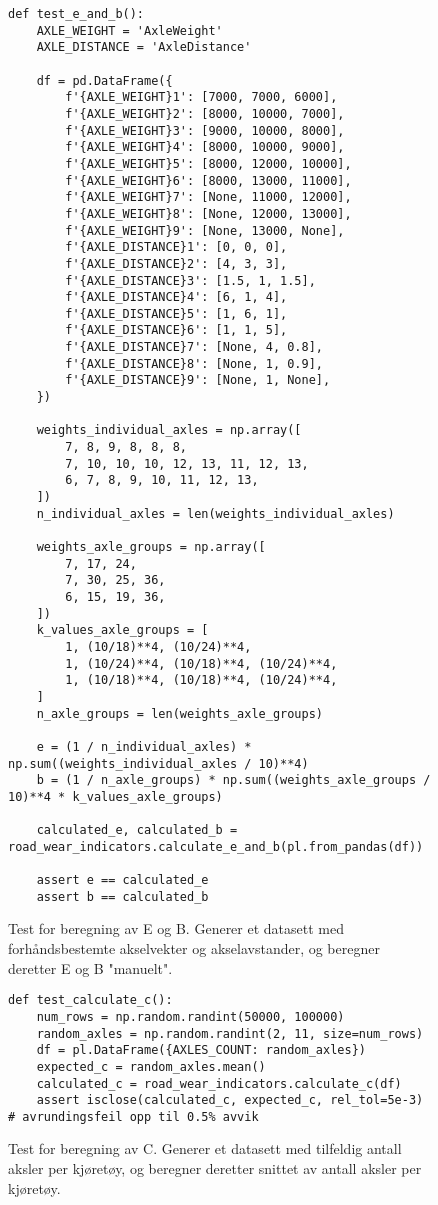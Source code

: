 \begin{figure}[ht]
\centering
\scriptsize
\begin{lstlisting}
def test_e_and_b():
    AXLE_WEIGHT = 'AxleWeight'
    AXLE_DISTANCE = 'AxleDistance'

    df = pd.DataFrame({
        f'{AXLE_WEIGHT}1': [7000, 7000, 6000],
        f'{AXLE_WEIGHT}2': [8000, 10000, 7000],
        f'{AXLE_WEIGHT}3': [9000, 10000, 8000],
        f'{AXLE_WEIGHT}4': [8000, 10000, 9000],
        f'{AXLE_WEIGHT}5': [8000, 12000, 10000],
        f'{AXLE_WEIGHT}6': [8000, 13000, 11000],
        f'{AXLE_WEIGHT}7': [None, 11000, 12000],
        f'{AXLE_WEIGHT}8': [None, 12000, 13000],
        f'{AXLE_WEIGHT}9': [None, 13000, None],
        f'{AXLE_DISTANCE}1': [0, 0, 0],
        f'{AXLE_DISTANCE}2': [4, 3, 3],
        f'{AXLE_DISTANCE}3': [1.5, 1, 1.5],
        f'{AXLE_DISTANCE}4': [6, 1, 4],
        f'{AXLE_DISTANCE}5': [1, 6, 1],
        f'{AXLE_DISTANCE}6': [1, 1, 5],
        f'{AXLE_DISTANCE}7': [None, 4, 0.8],
        f'{AXLE_DISTANCE}8': [None, 1, 0.9],
        f'{AXLE_DISTANCE}9': [None, 1, None],
    })

    weights_individual_axles = np.array([
        7, 8, 9, 8, 8, 8,
        7, 10, 10, 10, 12, 13, 11, 12, 13, 
        6, 7, 8, 9, 10, 11, 12, 13,
    ])
    n_individual_axles = len(weights_individual_axles)

    weights_axle_groups = np.array([
        7, 17, 24,
        7, 30, 25, 36, 
        6, 15, 19, 36,
    ])
    k_values_axle_groups = [
        1, (10/18)**4, (10/24)**4, 
        1, (10/24)**4, (10/18)**4, (10/24)**4,
        1, (10/18)**4, (10/18)**4, (10/24)**4,
    ]
    n_axle_groups = len(weights_axle_groups)

    e = (1 / n_individual_axles) * np.sum((weights_individual_axles / 10)**4)
    b = (1 / n_axle_groups) * np.sum((weights_axle_groups / 10)**4 * k_values_axle_groups)

    calculated_e, calculated_b = road_wear_indicators.calculate_e_and_b(pl.from_pandas(df))

    assert e == calculated_e
    assert b == calculated_b
\end{lstlisting}
\caption{Test for beregning av E og B. Generer et datasett med forhåndsbestemte akselvekter og akselavstander, og beregner deretter E og B "manuelt".}
\end{figure}

\begin{figure}[ht]
\centering
\scriptsize
\begin{lstlisting}
def test_calculate_c():
    num_rows = np.random.randint(50000, 100000)
    random_axles = np.random.randint(2, 11, size=num_rows)
    df = pl.DataFrame({AXLES_COUNT: random_axles})
    expected_c = random_axles.mean()
    calculated_c = road_wear_indicators.calculate_c(df)
    assert isclose(calculated_c, expected_c, rel_tol=5e-3) # avrundingsfeil opp til 0.5% avvik
\end{lstlisting}
\caption{Test for beregning av C. Generer et datasett med tilfeldig antall aksler per kjøretøy, og beregner deretter snittet av antall aksler per kjøretøy.}
\end{figure}
